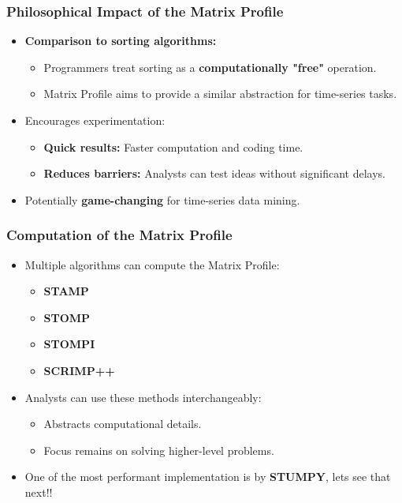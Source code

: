 \begin{frame}[fragile]\frametitle{Philosophical Impact of the Matrix Profile}
    \begin{itemize}
        \item \textbf{Comparison to sorting algorithms:}
            \begin{itemize}
                \item Programmers treat sorting as a \textbf{computationally "free"} operation.
                \item Matrix Profile aims to provide a similar abstraction for time-series tasks.
            \end{itemize}
        \item Encourages experimentation:
            \begin{itemize}
                \item \textbf{Quick results:} Faster computation and coding time.
                \item \textbf{Reduces barriers:} Analysts can test ideas without significant delays.
            \end{itemize}
        \item Potentially \textbf{game-changing} for time-series data mining.
    \end{itemize}
\end{frame}

\begin{frame}[fragile]\frametitle{Computation of the Matrix Profile}
    \begin{itemize}
        \item Multiple algorithms can compute the Matrix Profile:
            \begin{itemize}
                \item \textbf{STAMP} 
                \item \textbf{STOMP} 
                \item \textbf{STOMPI} 
                \item \textbf{SCRIMP++} 
            \end{itemize}
        \item Analysts can use these methods interchangeably:
            \begin{itemize}
                \item Abstracts computational details.
                \item Focus remains on solving higher-level problems.
            \end{itemize}
		\item One of the most performant implementation is by \textbf{STUMPY}, lets see that next!!
    \end{itemize}
\end{frame}

